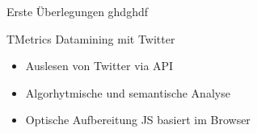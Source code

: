 \begin{frame}{Erste Überlegungen}
ghdghdf
\end{frame}

\begin{frame}{TMetrics}
Datamining mit Twitter
    \begin{itemize}
        \item Auslesen von Twitter via API
        \item Algorhytmische und semantische Analyse
        \item Optische Aufbereitung JS basiert im Browser
    \end{itemize}
\end{frame}
